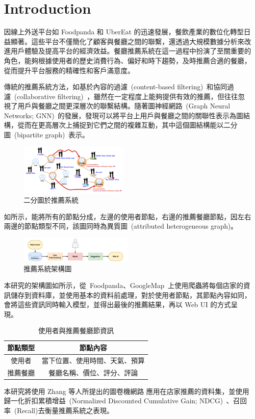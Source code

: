 \section{Introduction}
\label{sec:intro}

因線上外送平台如 Foodpanda 和 UberEat 的迅速發展，餐飲產業的數位化轉型日益顯著。這些平台不僅簡化了顧客與餐廳之間的聯繫，還透過大規模數據分析來改進用戶體驗及提高平台的經濟效益。餐廳推薦系統在這一過程中扮演了至關重要的角色，能夠根據使用者的歷史消費行為、偏好和時下趨勢，及時推薦合適的餐廳，從而提升平台服務的精確性和客戶滿意度。

傳統的推薦系統方法，如基於內容的過濾~(content-based filtering)~和協同過濾~(collaborative filtering)~，雖然在一定程度上能夠提供有效的推薦，但往往忽視了用戶與餐廳之間更深層次的聯繫結構。隨著圖神經網路~(Graph Neural Networks; GNN)~的發展，發現可以將平台上用戶與餐廳之間的關聯性表示為圖結構，從而在更高層次上捕捉到它們之間的複雜互動，其中這個圖結構能以二分圖~(bipartite graph)~表示。
\begin{figure}[tbh]
    \centering
    \includegraphics[width=0.48\textwidth]{img/bipartite_graph.pdf}
    \caption{二分圖於推薦系統~\cite{bipratite_fig}}
    \label{fig-bipartite}
\end{figure}
如所示，能將所有的節點分成，左邊的使用者節點，右邊的推薦餐廳節點，因左右兩邊的節點類型不同，該圖同時為異質圖~(attributed heterogeneous graph)。
\begin{figure}[tbh]
    \centering
    \includegraphics[width=0.5\textwidth]{img/flowg2.pdf}
    \caption{推薦系統架構圖}
    \label{fig-flowchart}
\end{figure}
本研究的架構圖如所示，從~Foodpanda、GoogleMap~上使用爬蟲將每個店家的資訊儲存到資料庫，並使用基本的資料前處理，對於使用者節點，其節點內容如同，會將這些資訊同時輸入模型，並得出最後的推薦結果，再以 Web UI 的方式呈現。
\begin{table}[htbp]
    \centering
    \renewcommand{\arraystretch}{1.15}
    \setlength{\tabcolsep}{7.5pt}
    \begin{tabular}{|c|c|}
    \hline
    \textbf{節點類型}   & \textbf{節點內容}                    \\ \hline
    使用者         & 當下位置、使用時間、天氣、預算          \\ \hline
    推薦餐廳      & 餐廳名稱、價位、評分、評論              \\ \hline
    \end{tabular}
    \caption{使用者與推薦餐廳節資訊}
    \label{node-conetent}
\end{table}
\vspace{-0.35cm}
本研究將使用 Zhang 等人所提出的圖卷機網路 \cite{NIE-GCN} 應用在店家推薦的資料集，並使用歸一化折扣累積增益~(Normalized Discounted Cumulative Gain; NDCG)~、召回率~(Recall)去衡量推薦系統之表現。




    